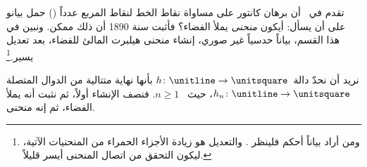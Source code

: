 \documentclass[../../../include/open-logic-section]{subfiles}
\begin{document}


تقدم في~ أن برهان كانتور على مساواة نقاط الخط لنقاط
المربع عدداً () حمل بيانو
على أن يسأل: أيكون \emph{منحنى} يملأ الفضاء؟ فأثبت سنة 1890 أن ذلك ممكن.
ونبين في هذا القسم، بياناً حدسياً غير صوري، إنشاء منحنى هيلبرت المالئ
للفضاء، بعد تعديل يسير.\footnote{ومن أراد بياناً أحكم فلينظر
\cite{Rose2010}. والتعديل هو زيادة الأجزاء الحمراء من المنحنيات الآتية،
ليكون التحقق من اتصال المنحنى أيسر قليلاً.}

نريد أن نحدّ دالة~$h \colon \unitline \to \unitsquare$ بأنها نهاية
متتالية من الدوال المتصلة $h_n \colon \unitline \to \unitsquare$، حيث
~$n \geq 1$. فنصف الإنشاء أولاً، ثم نثبت أنه يملأ الفضاء، ثم إنه منحنى.
\end{document}
